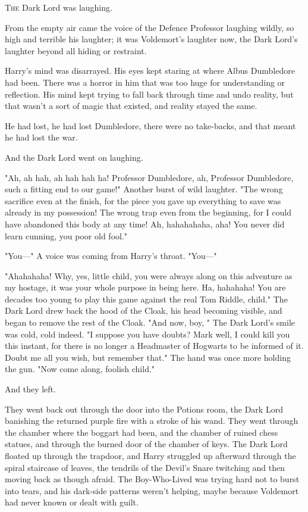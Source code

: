 
\lettrine{T}{he} Dark Lord was
laughing.

\quad\quad
From the empty air came the voice of the Defence Professor laughing wildly, so
high and terrible his laughter; it was Voldemort's laughter now, the Dark
Lord's laughter beyond all hiding or restraint.

Harry's mind was disarrayed. His eyes kept staring at where Albus Dumbledore
had been. There was a horror in him that was too huge for understanding or
reflection. His mind kept trying to fall back through time and undo reality,
but that wasn't a sort of magic that existed, and reality stayed the same.

He had lost, he had lost Dumbledore, there were no take-backs, and that meant
he had lost the war.

And the Dark Lord went on laughing.

"Ah, ah hah, ah hah hah ha! Professor Dumbledore, ah, Professor Dumbledore,
such a fitting end to our game!" Another burst of wild laughter. "The wrong
sacrifice even at the finish, for the piece you gave up everything to save was
already in my possession! The wrong trap even from the beginning, for I could
have abandoned this body at any time! Ah, hahahahaha, aha! You never did learn
cunning, you poor old fool."

"You---" A voice was coming from Harry's throat. "You---"

"Ahahahaha! Why, yes, little child, you were always along on this adventure as
my hostage, it was your whole purpose in being here. Ha, hahahaha! You are
decades too young to play this game against the real Tom Riddle, child." The
Dark Lord drew back the hood of the Cloak, his head becoming visible, and began
to remove the rest of the Cloak. "And now, boy, " The Dark Lord's smile was cold, cold indeed. "I suppose you have
doubts? Mark well, I could kill you this instant, for there is no longer a
Headmaster of Hogwarts to be informed of it. Doubt me all you wish, but
remember that." The hand was once more holding the gun. "Now come along,
foolish child."

And they left.

They went back out through the door into the Potions room, the Dark Lord
banishing the returned purple fire with a stroke of his wand. They went through
the chamber where the boggart had been, and the chamber of ruined chess
statues, and through the burned door of the chamber of keys. The Dark Lord
floated up through the trapdoor, and Harry struggled up afterward through the
spiral staircase of leaves, the tendrils of the Devil's Snare twitching and
then moving back as though afraid. The Boy-Who-Lived was trying hard not to
burst into tears, and his dark-side patterns weren't helping, maybe because
Voldemort had never known or dealt with guilt.

